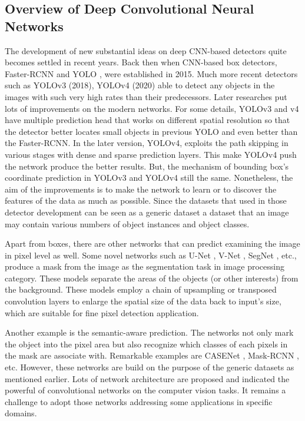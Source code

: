 \documentclass[default,pdflatex,iicol]{sn-jnl}%
\begin{document}
\subsection{Overview of Deep Convolutional Neural Networks}
The development of new substantial ideas on deep CNN-based detectors quite becomes settled in recent years. Back then when CNN-based box detectors, Faster-RCNN \cite{fasterrcnn} and YOLO \cite{redmonyolov1}, were established in 2015. Much more recent detectors such as YOLOv3 \cite{redmonyolov3} (2018), YOLOv4 \cite{alexyyolov4} (2020) able to detect any objects in the images with such very high rates than their predecessors. Later researches put lots of improvements on the modern networks. For some details, YOLOv3 and v4 have multiple prediction head that works on different spatial resolution so that the detector better locates small objects in previous YOLO and even better than the Faster-RCNN. In the later version, YOLOv4, exploits the path skipping in various stages with dense and sparse prediction layers. This make YOLOv4 push the network produce the better results. But, the mechanism of bounding box's coordinate prediction in YOLOv3 and YOLOv4 still the same. Nonetheless, the aim of the improvements is to make the network to learn or to discover the features of the data as much as possible. Since the datasets that used in those detector development can be seen as a generic dataset \textemdash a dataset that an image may contain various numbers of object instances and object classes. 

Apart from boxes, there are other networks that can predict examining the image in pixel level as well. Some novel networks such as U-Net \cite{unet}, V-Net \cite{vnet}, SegNet \cite{segnet}, etc., produce a mask from the image as the segmentation task in image processing category. These models separate the areas of the objects (or other interests) from the background. These models employ a chain of upsampling or transposed convolution layers to enlarge the spatial size of the data back to input's size, which are suitable for fine pixel detection application.

Another example is the semantic-aware prediction. The networks not only mark the object into the pixel area but also recognize which classes of each pixels in the mask are associate with. Remarkable examples are CASENet \cite{casenet}, Mask-RCNN \cite{maskrcnn}, etc. However, these networks are build on the purpose of the generic datasets as mentioned earlier. Lots of network architecture are proposed and indicated the powerful of convolutional networks on the computer vision tasks. It remains a challenge to adopt those networks addressing some applications in specific domains.
\end{document}
